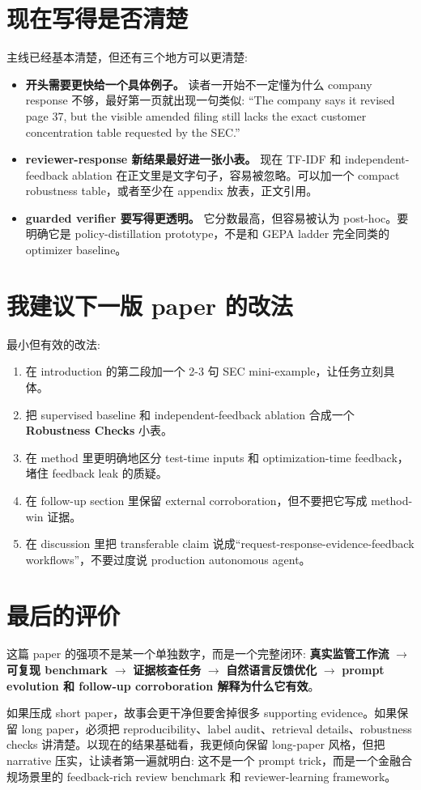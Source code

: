 \documentclass[11pt,fontset=none]{ctexart}
\begin{document}
\section*{现在写得是否清楚}

主线已经基本清楚，但还有三个地方可以更清楚:
\begin{itemize}
    \item \textbf{开头需要更快给一个具体例子。} 读者一开始不一定懂为什么 company response 不够，最好第一页就出现一句类似: ``The company says it revised page 37, but the visible amended filing still lacks the exact customer concentration table requested by the SEC.''
    \item \textbf{reviewer-response 新结果最好进一张小表。} 现在 TF-IDF 和 independent-feedback ablation 在正文里是文字句子，容易被忽略。可以加一个 compact robustness table，或者至少在 appendix 放表，正文引用。
    \item \textbf{guarded verifier 要写得更透明。} 它分数最高，但容易被认为 post-hoc。要明确它是 policy-distillation prototype，不是和 GEPA ladder 完全同类的 optimizer baseline。
\end{itemize}

\section*{我建议下一版 paper 的改法}

最小但有效的改法:
\begin{enumerate}[leftmargin=1.6em,itemsep=0.25em]
    \item 在 introduction 的第二段加一个 2-3 句 SEC mini-example，让任务立刻具体。
    \item 把 supervised baseline 和 independent-feedback ablation 合成一个 \textbf{Robustness Checks} 小表。
    \item 在 method 里更明确地区分 test-time inputs 和 optimization-time feedback，堵住 feedback leak 的质疑。
    \item 在 follow-up section 里保留 external corroboration，但不要把它写成 method-win 证据。
    \item 在 discussion 里把 transferable claim 说成``request-response-evidence-feedback workflows''，不要过度说 production autonomous agent。
\end{enumerate}

\section*{最后的评价}

这篇 paper 的强项不是某一个单独数字，而是一个完整闭环: \textbf{真实监管工作流} $\rightarrow$ \textbf{可复现 benchmark} $\rightarrow$ \textbf{证据核查任务} $\rightarrow$ \textbf{自然语言反馈优化} $\rightarrow$ \textbf{prompt evolution 和 follow-up corroboration 解释为什么它有效}。

如果压成 short paper，故事会更干净但要舍掉很多 supporting evidence。如果保留 long paper，必须把 reproducibility、label audit、retrieval details、robustness checks 讲清楚。以现在的结果基础看，我更倾向保留 long-paper 风格，但把 narrative 压实，让读者第一遍就明白: 这不是一个 prompt trick，而是一个金融合规场景里的 feedback-rich review benchmark 和 reviewer-learning framework。
\end{document}
